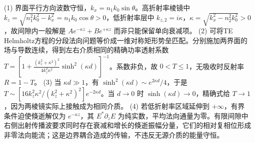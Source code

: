(1) 界面平行方向波数守恒，\(k_x=n_1k_0\sin\theta\)。高折射率棱镜中 \(k_z=\sqrt{n_1^2k_0^2-k_x^2}=n_1k_0\cos\theta>0\)，低折射率层中 \(k_{z,2}=i\kappa\)，\(\kappa=\sqrt{k_x^2-n_2^2k_0^2}>0\)，故间隙内一般解是 \(Ae^{-\kappa z}+Be^{+\kappa z}\) 而非只能保留单向衰减项。
(2) 可将TE Helmholtz方程的分段法向问题等价成一维对称矩形势垒匹配。分别施加两界面的场与导数连续，得到左右介质相同的精确功率透射系数 \(T=\left[1+\frac{(k_z^2+\kappa^2)^2}{4k_z^2\kappa^2}\sinh^2(\kappa d)\right]^{-1}\)。系数非负，故 \(0<T\le1\)，无吸收时反射率 \(R=1-T\)。
(3) 当 \(\kappa d\gg1\)，有 \(\sinh^2(\kappa d)\sim e^{2\kappa d}/4\)，于是 \(T\sim[16k_z^2\kappa^2/(k_z^2+\kappa^2)^2]e^{-2\kappa d}\)。当 \(d\to0\) 时 \(\sinh(\kappa d)\to0\)，精确式给 \(T\to1\)，因为两棱镜实际上接触成为相同介质。
(4) 若低折射率区域延伸到 \(+\infty\)，有界条件迫使倏逝解仅为 \(e^{-\kappa z}\)，其 \(E^*\partial_zE\) 为纯实数，平均法向通量为零。有限间隙中右侧出射传播波要求同时存在衰减和增长的倏逝振幅分量，它们的相对复相位形成非零法向能流；这是边界耦合造成的传输，不违反无源介质的能量守恒。
